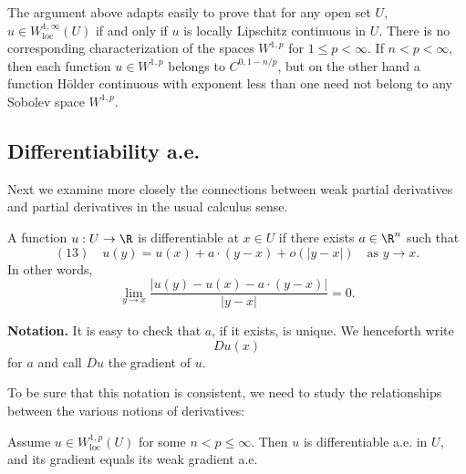\begin{remark}
\label{rem:local-lipschitz-w1infty-loc-remark}
The argument above adapts easily to prove that for any open set $U$, $u \in W^{1,\infty}_{\text{loc}}(U)$ if and only if $u$ is locally Lipschitz continuous in $U$. There is no corresponding characterization of the spaces $W^{1,p}$ for $1 \le p < \infty$. If $n < p < \infty$, then each function $u \in W^{1,p}$ belongs to $C^{0,1-n/p}$, but on the other hand a function Hölder continuous with exponent less than one need not belong to any Sobolev space $W^{1,p}$.
\end{remark}

\subsection{Differentiability a.e.}

Next we examine more closely the connections between weak partial derivatives and partial derivatives in the usual calculus sense.

\begin{definition}
\label{def:differentiability-at-a-point}
A function $u: U \to \R$ is differentiable at $x \in U$ if there exists $a \in \R^n$ such that
$$(13) \quad u(y) = u(x) + a \cdot (y - x) + o(|y - x|) \quad \text{as } y \to x.$$
In other words,
$$\lim_{y \to x} \frac{|u(y) - u(x) - a \cdot (y - x)|}{|y - x|} = 0.$$
\end{definition}

\textbf{Notation.} It is easy to check that $a$, if it exists, is unique. We henceforth write
$$Du(x)$$
for $a$ and call $Du$ the gradient of $u$.

To be sure that this notation is consistent, we need to study the relationships between the various notions of derivatives:

\begin{theorem}
\label{thm:differentiability-almost-everywhere}
Assume $u \in W^{1,p}_{\text{loc}}(U)$ for some $n < p \le \infty$. Then $u$ is differentiable a.e. in $U$, and its gradient equals its weak gradient a.e.
\end{theorem}

